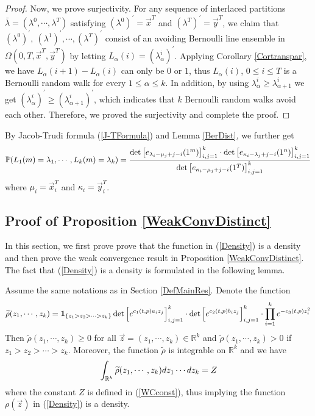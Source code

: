 \begin{proof}
Now, we prove surjectivity. For any sequence of interlaced partitions $\bar\lambda=(\lambda^0,\cdots,\lambda^T)$ satisfying $(\lambda^{0})^{\prime}=\vec{x}^{T}$ and $(\lambda^{T})^{\prime}=\vec{y}^{T}$, we claim that $(\lambda^{0})^{\prime},\ (\lambda^{1})^{\prime},\cdots, (\lambda^{T})^{\prime}$ consist of an avoiding Bernoulli line ensemble in $\Omega(0,T,\vec{x}^{T},\vec{y}^{T})$ by letting $L_{\alpha}(i)=(\lambda_{\alpha}^{i})^{\prime}$. Applying Corollary \ref{Cortranspar}, we have $L_{\alpha}(i+1)-L_{\alpha}(i)$ can only be $0$ or $1$, thus $L_{\alpha}(i)$, $0\leq i\leq T$ is a Bernoulli random walk for every $1\leq \alpha\leq k$. In addition, by using $\lambda_{\alpha}^{i}\geq \lambda_{\alpha+1}^{i}$ we get $(\lambda_{\alpha}^{i})^{\prime}\geq (\lambda_{\alpha+1}^{i})^{\prime}$, which indicates that $k$ Bernoulli random walks avoid each other. Therefore, we proved the surjectivity and complete the proof.
\end{proof}

By Jacob-Trudi formula (\ref	{J-TFormula}) and Lemma \ref	{BerDist}, we further get
\begin{align}{\label{BerDistJT}}
	\begin{split}
		\mathbb{P}(L_1(m)=\lambda_1,\cdots, L_k(m)=\lambda_k)=\frac{\det\left[e_{\lambda_{i}-\mu_{j}+j-i}(1^{m})\right]_{i,j=1}^{k}\cdot\det\left[e_{\kappa_{i}-\lambda_{j}+j-i}(1^{n})\right]_{i,j=1}^{k}}{\det\left[e_{\kappa_{i}-\mu_{j}+j-i}(1^{T})\right]_{i,j=1}^{k}}
	\end{split}
\end{align}
where $\mu_{i}=\vec{x}^{T}_{i}$ and $\kappa_{i}=\vec{y}^{T}_{i}$.
\subsection{Proof of Proposition \ref{WeakConvDistinct}}{\label{ProofProp1}} In this section, we first prove prove that the function in (\ref{Density}) is a density and then prove the weak convergence result in Proposition \ref{WeakConvDistinct}. The fact that (\ref{Density}) is a density is formulated in the following lemma.

\begin{lemma}{\label{PfDensity}}
	Assume the same notations as in Section \ref{DefMainRes}. Denote the function 
	\begin{align}{\label{rhotilde}}
		\widetilde{\rho}(z_1,\cdots,z_k)=\mathbf{1}_{\{z_1>z_2>\cdots>z_k\}}\det\left[e^{c_{1}(t,p)a_i z_j}\right]_{i,j=1}^{k}\cdot\det\left[e^{c_{2}(t,p)b_i z_j}\right]_{i,j=1}^{k}\cdot\prod_{i=1}^{k}e^{-c_3(t,p)z_{i}^{2}}
	\end{align}
	Then $\widetilde{\rho}(z_1,\cdots,z_k)\geq 0$ for all $\vec{z}=(z_1,\cdots,z_k)\in\mathbb{R}^{k}$ and $\widetilde{\rho}(z_1,\cdots,z_k)>0$ if $z_1>z_2>\cdots>z_k$. Moreover, the function $\widetilde{\rho}$ is integrable on $\mathbb{R}^{k}$ and we have
	\begin{align}{\label{NormCons}}
		\int_{\mathbb{R}^{k}}\widetilde{\rho}(z_1,\cdots,z_k)dz_1\cdots dz_k=Z
	\end{align}
	where the constant $Z$ is defined in (\ref{WCconst}), thus implying the function $\rho(\vec{z})$ in (\ref{Density}) is a density.
\end{lemma}


